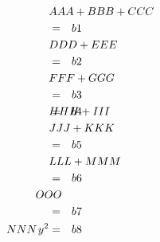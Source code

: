 \documentclass{article}
\let\ln\nonumber
\DeclareRobustCommand\rn{\nonumber}
\def\eq{&=&}
\def\rnn{\relax\nonumber}
\begin{document}
\begin{eqnarray}
\lefteqn{AAA+BBB+CCC} \label{x1} \\ &=& b1 \\
\lefteqn{DDD+EEE} \ln \\ &=& b2 \\
\lefteqn{FFF+GGG} \rn \\ &=& b3 \\
\lefteqn{HHH+III} \eq b4 \\
\lefteqn{JJJ+KKK} {\nonumber} \\ &=& b5 \\
\lefteqn{LLL+MMM} \rnn \\ &=& b6 \\
\lefteqn{OOO} \relax\strut\vphantom{X}\kern 2pt\hskip 1em plus 1fil \\ &=& b7 \\
\lefteqn{NNN} \hskip 1cm y^2 &=& b8
\end{eqnarray}
\end{document}
